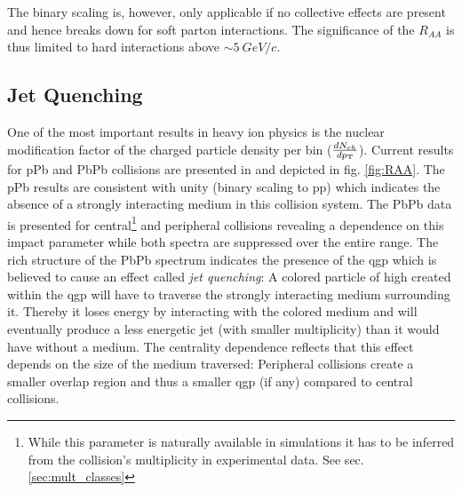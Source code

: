 The binary scaling is, however, only applicable if no collective effects are present and hence breaks down for soft parton interactions. The significance of the $R_{AA}$ is thus limited to hard interactions above $\sim \SI{5}{GeV/c}$.

\subsection{ Jet Quenching}
\label{sec:jet-quenching}

One of the most important results in heavy ion physics is the nuclear modification factor of the charged particle density per \pt bin ($\frac{dN_{ch}}{dp_{\text{T}}}$). Current results for \gls{pPb} and \gls{PbPb} collisions are presented in \cite{Abelev2013} and depicted in fig. \ref{fig:RAA}. The \gls{pPb} results are consistent with unity (binary scaling to \gls{pp}) which indicates the absence of a strongly interacting medium in this collision system. The \gls{PbPb} data is presented for central\footnote{While this parameter is naturally available in simulations it has to be inferred from the collision's multiplicity in experimental data. See sec. \ref{sec:mult_classes}} and peripheral collisions revealing a dependence on this impact parameter while both spectra are suppressed over the entire \pt range. The rich structure of the \gls{PbPb} spectrum indicates the presence of the \gls{qgp} which is believed to cause an effect called \emph{jet quenching}: A colored particle of high \pt created within the \gls{qgp} will have to traverse the strongly interacting medium surrounding it. Thereby it loses energy by interacting with the colored medium and will eventually produce a less energetic jet (with smaller multiplicity) than it would have without a medium. The centrality dependence reflects that this effect depends on the size of the medium traversed: Peripheral collisions create a smaller overlap region and thus a smaller \gls{qgp} (if any) compared to central collisions.

